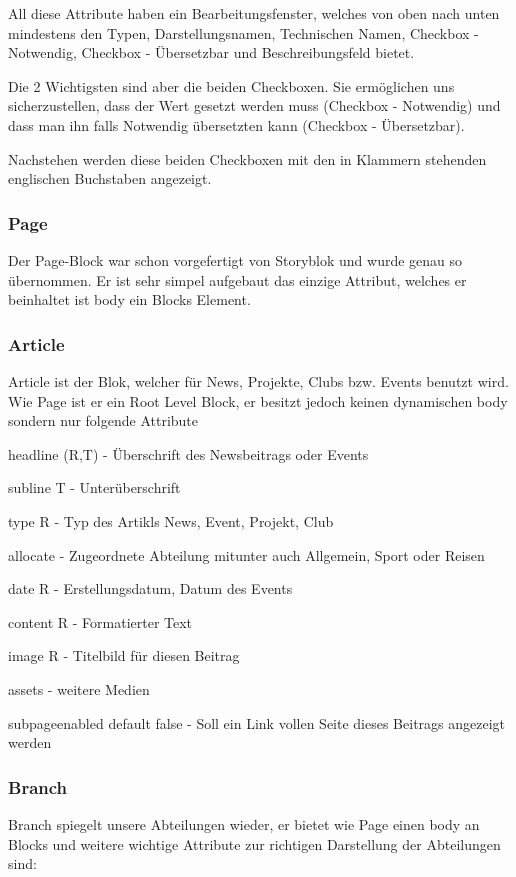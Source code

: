 All diese Attribute haben ein Bearbeitungsfenster, welches von oben nach unten mindestens den Typen, Darstellungsnamen, Technischen Namen, Checkbox - Notwendig, Checkbox - Übersetzbar und Beschreibungsfeld bietet.

Die 2 Wichtigsten sind aber die beiden Checkboxen. Sie ermöglichen uns sicherzustellen, dass der Wert gesetzt werden muss (Checkbox - Notwendig) und dass man ihn falls Notwendig übersetzten kann (Checkbox - Übersetzbar). 

Nachstehen werden diese beiden Checkboxen mit den in Klammern stehenden englischen Buchstaben angezeigt.

\subsubsection*{Page}
Der Page-Block war schon vorgefertigt von Storyblok und wurde genau so übernommen.
Er ist sehr simpel aufgebaut das einzige Attribut, welches er beinhaltet ist body ein Blocks Element.

\subsubsection*{Article}
Article ist der Blok, welcher für News, Projekte, Clubs bzw. Events benutzt wird. 
Wie Page ist er ein Root Level Block, er besitzt jedoch keinen dynamischen body sondern nur folgende Attribute

headline (R,T) - Überschrift des Newsbeitrags oder Events 

subline T - Unterüberschrift

type R -  Typ des Artikls News, Event, Projekt, Club

allocate - Zugeordnete Abteilung mitunter auch Allgemein, Sport oder Reisen

date R - Erstellungsdatum, Datum des Events

content R - Formatierter Text

image R - Titelbild für diesen Beitrag

assets - weitere Medien

subpage\textunderscore enabled default false - Soll ein Link vollen Seite dieses Beitrags angezeigt werden

\subsubsection*{Branch}
Branch spiegelt unsere Abteilungen wieder, er bietet wie Page einen body an Blocks und weitere wichtige Attribute zur richtigen Darstellung der Abteilungen sind:


